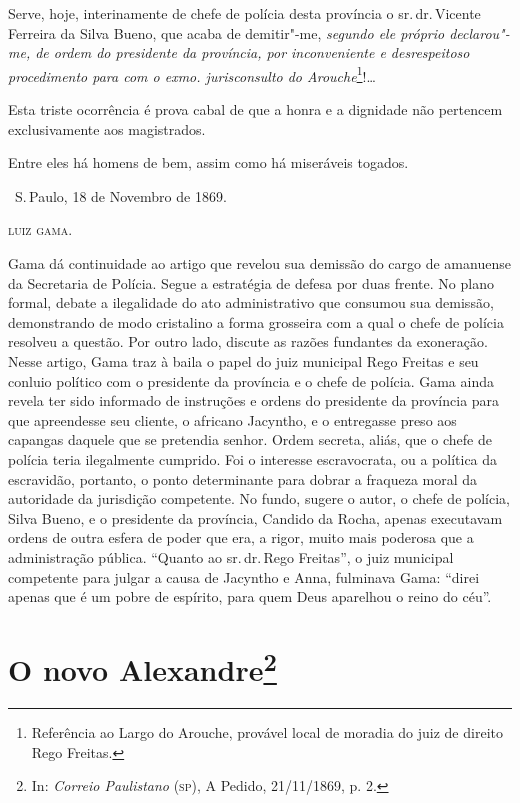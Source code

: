 Serve, hoje, interinamente de chefe de polícia desta província o sr.\,dr.\,Vicente Ferreira da Silva Bueno, que acaba de demitir"-me, \emph{segundo
ele próprio declarou"-me, de ordem do presidente da província, por
inconveniente e desrespeitoso procedimento para com o exmo.
jurisconsulto do Arouche}\footnote{Referência ao Largo do Arouche,
  provável local de moradia do juiz de direito Rego Freitas.}!\ldots{}

Esta triste ocorrência é
prova cabal de que a honra e a dignidade não pertencem exclusivamente
aos magistrados.

Entre eles há homens de bem, assim como há miseráveis togados.

\medskip

\hfill\ S.\,Paulo, 18 de Novembro de 1869.\smallskip

\hfill\textsc{luiz gama.}

\pagebreak
\mbox{}\vfill
\thispagestyle{empty}

{\small\noindent
Gama dá continuidade ao artigo que revelou sua demissão do cargo
de amanuense da Secretaria de Polícia. Segue a estratégia de defesa por
duas frente. No plano formal, debate a ilegalidade do ato administrativo
que consumou sua demissão, demonstrando de modo cristalino a forma
grosseira com a qual o chefe de polícia resolveu a questão. Por outro
lado, discute as razões fundantes da exoneração. Nesse artigo, Gama traz
à baila o papel do juiz municipal Rego Freitas e seu conluio político
com o presidente da província e o chefe de
polícia. Gama ainda revela ter sido informado de instruções e ordens do
presidente da província para que apreendesse seu cliente, o africano
Jacyntho, e o entregasse preso aos capangas daquele que se pretendia
senhor. Ordem secreta, aliás, que o chefe de polícia teria ilegalmente
cumprido. Foi o interesse escravocrata, ou a política da escravidão,
portanto, o ponto determinante para dobrar a fraqueza
moral da autoridade da
jurisdição competente. No fundo, sugere o autor, o chefe de polícia,
Silva Bueno, e o presidente da província, Candido da Rocha, apenas
executavam ordens de outra esfera de poder que era, a rigor, muito mais
poderosa que a administração pública. ``Quanto ao sr.\,dr.\,Rego Freitas'',
o juiz municipal competente para julgar a causa de Jacyntho e Anna,
fulminava Gama: ``direi apenas que é um pobre de espírito, para quem Deus
aparelhou o reino do céu''. }

\chapter{O novo Alexandre\footnote[*]{In: \emph{Correio Paulistano}
  (\textsc{sp}), A Pedido, 21/11/1869, p. 2.}}

